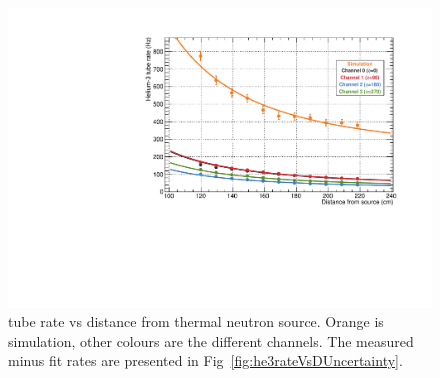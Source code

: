 \begin{figure}
	\centerfloat
		\includegraphics[trim={0 0 0 0.75cm},clip, width=\textwidth]{images/Parallel_Calibration}
	\caption[\He tube rate vs distance from thermal neutron source]{\He tube rate vs distance from thermal neutron source. Orange is simulation, other colours are the different channels. The measured minus fit rates are presented in Fig~\ref{fig:he3rateVsDUncertainty}.}	
	\label{fig:he3rateVsD}
\end{figure}

